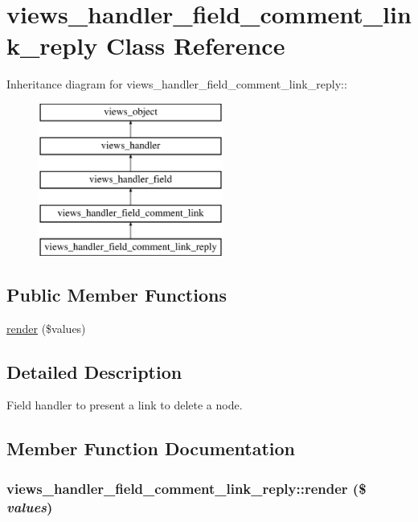 \hypertarget{classviews__handler__field__comment__link__reply}{
\section{views\_\-handler\_\-field\_\-comment\_\-link\_\-reply Class Reference}
\label{classviews__handler__field__comment__link__reply}
}
Inheritance diagram for views\_\-handler\_\-field\_\-comment\_\-link\_\-reply::\begin{figure}[H]
\begin{center}
\leavevmode
\includegraphics[height=5cm]{classviews__handler__field__comment__link__reply}
\end{center}
\end{figure}
\subsection*{Public Member Functions}
\begin{CompactItemize}
\item 
\hyperlink{classviews__handler__field__comment__link__reply_5396a9f0f1101774c721f54600fafbda}{render} (\$values)
\end{CompactItemize}


\subsection{Detailed Description}
Field handler to present a link to delete a node. 

\subsection{Member Function Documentation}
\hypertarget{classviews__handler__field__comment__link__reply_5396a9f0f1101774c721f54600fafbda}{
\subsubsection[{render}]{\setlength{\rightskip}{0pt plus 5cm}views\_\-handler\_\-field\_\-comment\_\-link\_\-reply::render (\$ {\em values})}}
\label{classviews__handler__field__comment__link__reply_5396a9f0f1101774c721f54600fafbda}


